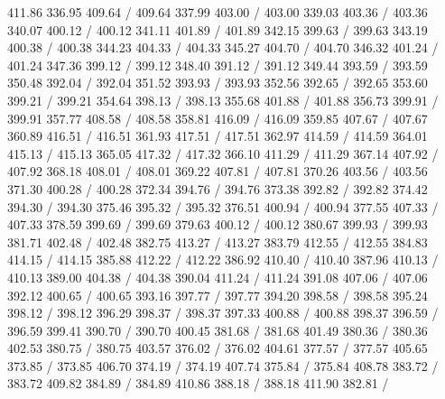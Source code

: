 { 411.86 336.95 409.64 /
 409.64 337.99 403.00 /
 403.00 339.03 403.36 /
 403.36 340.07 400.12 /
 400.12 341.11 401.89 /
 401.89 342.15 399.63 /
 399.63 343.19 400.38 /
 400.38 344.23 404.33 /
 404.33 345.27 404.70 /
 404.70 346.32 401.24 /
 401.24 347.36 399.12 /
 399.12 348.40 391.12 /
 391.12 349.44 393.59 /
 393.59 350.48 392.04 /
 392.04 351.52 393.93 /
 393.93 352.56 392.65 /
 392.65 353.60 399.21 /
 399.21 354.64 398.13 /
 398.13 355.68 401.88 /
 401.88 356.73 399.91 /
 399.91 357.77 408.58 /
 408.58 358.81 416.09 /
 416.09 359.85 407.67 /
 407.67 360.89 416.51 /
 416.51 361.93 417.51 /
 417.51 362.97 414.59 /
 414.59 364.01 415.13 /
 415.13 365.05 417.32 /
 417.32 366.10 411.29 /
 411.29 367.14 407.92 /
 407.92 368.18 408.01 /
 408.01 369.22 407.81 /
 407.81 370.26 403.56 /
 403.56 371.30 400.28 /
 400.28 372.34 394.76 /
 394.76 373.38 392.82 /
 392.82 374.42 394.30 /
 394.30 375.46 395.32 /
 395.32 376.51 400.94 /
 400.94 377.55 407.33 /
 407.33 378.59 399.69 /
 399.69 379.63 400.12 /
 400.12 380.67 399.93 /
 399.93 381.71 402.48 /
 402.48 382.75 413.27 /
 413.27 383.79 412.55 /
 412.55 384.83 414.15 /
 414.15 385.88 412.22 /
 412.22 386.92 410.40 /
 410.40 387.96 410.13 /
 410.13 389.00 404.38 /
 404.38 390.04 411.24 /
 411.24 391.08 407.06 /
 407.06 392.12 400.65 /
 400.65 393.16 397.77 /
 397.77 394.20 398.58 /
 398.58 395.24 398.12 /
 398.12 396.29 398.37 /
 398.37 397.33 400.88 /
 400.88 398.37 396.59 /
 396.59 399.41 390.70 /
 390.70 400.45 381.68 /
 381.68 401.49 380.36 /
 380.36 402.53 380.75 /
 380.75 403.57 376.02 /
 376.02 404.61 377.57 /
 377.57 405.65 373.85 /
 373.85 406.70 374.19 /
 374.19 407.74 375.84 /
 375.84 408.78 383.72 /
 383.72 409.82 384.89 /
 384.89 410.86 388.18 /
 388.18 411.90 382.81 /
}
